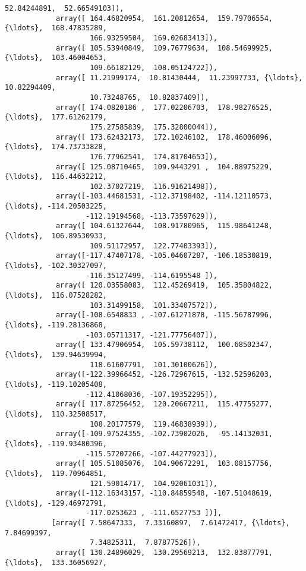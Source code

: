 \documentclass[11pt]{article}
\begin{document}
\begin{Verbatim}[commandchars=\\\{\}]
                    52.84244891,  52.66549103]),
            array([ 164.46820954,  161.20812654,  159.79706554, {\ldots},  168.47835289,
                    166.93259504,  169.02683413]),
            array([ 105.53940849,  109.76779634,  108.54699925, {\ldots},  103.46004653,
                    109.66182129,  108.05124722]),
            array([ 11.21999174,  10.81430444,  11.23997733, {\ldots},  10.82294409,
                    10.73248765,  10.82837409]),
            array([ 174.0820186 ,  177.02206703,  178.98276525, {\ldots},  177.61262179,
                    175.27585839,  175.32800044]),
            array([ 173.62432173,  172.10246102,  178.46006096, {\ldots},  174.73733828,
                    176.77962541,  174.81704653]),
            array([ 125.08710465,  109.9443291 ,  104.88975229, {\ldots},  116.44632212,
                    102.37027219,  116.91621498]),
            array([-103.44681531, -112.37198402, -114.12110573, {\ldots}, -114.20503225,
                   -112.19194568, -113.73597629]),
            array([ 104.61327644,  108.91780965,  115.98641248, {\ldots},  106.89530933,
                    109.51172957,  122.77403393]),
            array([-117.47407178, -105.04607287, -106.18530819, {\ldots}, -102.30327097,
                   -116.35127499, -114.6195548 ]),
            array([ 120.03558083,  112.45269419,  105.35804822, {\ldots},  116.07528282,
                    103.31499158,  101.33407572]),
            array([-108.6548833 , -107.61271878, -115.56787996, {\ldots}, -119.28136868,
                   -103.05711317, -121.77756407]),
            array([ 133.47906954,  105.59738112,  100.68502347, {\ldots},  139.94639994,
                    118.61607791,  101.30100626]),
            array([-122.39966452, -126.72967615, -132.52596203, {\ldots}, -119.10205408,
                   -112.41068036, -107.19352295]),
            array([ 117.87256452,  120.20667211,  115.47755277, {\ldots},  110.32508517,
                    108.20177579,  119.46838939]),
            array([-109.97524355, -102.73902026,  -95.14132031, {\ldots}, -119.93480396,
                   -115.57207266, -107.44277923]),
            array([ 105.51085076,  104.90672291,  103.08157756, {\ldots},  119.70964851,
                    121.59014717,  104.92061031]),
            array([-112.16343157, -110.84859548, -107.51048619, {\ldots}, -129.46972791,
                   -117.0253623 , -111.6527753 ])],
           [array([ 7.58647333,  7.33160897,  7.61472417, {\ldots},  7.84699397,
                    7.34825311,  7.87877526]),
            array([ 130.24896029,  130.29569213,  132.83877791, {\ldots},  133.36056927,

\end{Verbatim}
\end{document}

